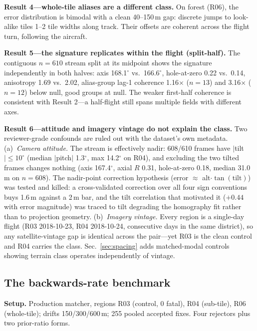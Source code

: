 \documentclass[journal]{IEEEtran}
\begin{document}
\textbf{Result 4---whole-tile aliases are a different class.} On forest (R06), the error distribution is bimodal with a clean 40--150\,m gap: discrete jumps to look-alike tiles 1--2 tile widths along track. Their offsets are coherent across the flight turn, following the aircraft.

\textbf{Result 5---the signature replicates within the flight (split-half).} The contiguous $n=610$ stream split at its midpoint shows the signature independently in both halves: axis 168.1$^{\circ}$ vs.\ 166.6$^{\circ}$, hole-at-zero 0.22 vs.\ 0.14, anisotropy 1.69 vs.\ 2.02, alias-group lag-1 coherence 1.16$\times$ ($n=13$) and 3.16$\times$ ($n=12$) below null, good groups at null. The weaker first-half coherence is consistent with Result 2---a half-flight still spans multiple fields with different axes.

\textbf{Result 6---attitude and imagery vintage do not explain the class.} Two reviewer-grade confounds are ruled out with the dataset's own metadata. (a)~\emph{Camera attitude.} The stream is effectively nadir: 608/610 frames have $|$tilt$| \leq 10^{\circ}$ (median $|$pitch$|$ 1.3$^{\circ}$, max 14.2$^{\circ}$ on R04), and excluding the two tilted frames changes nothing (axis 167.4$^{\circ}$, axial $R$ 0.31, hole-at-zero 0.18, median 31.0\,m on $n=608$). The nadir-point correction hypothesis (error $\approx$ alt$\cdot\tan(\mathrm{tilt})$) was tested and killed: a cross-validated correction over all four sign conventions buys 1.6\,m against a 2\,m bar, and the tilt correlation that motivated it ($+0.44$ with error magnitude) was traced to tilt degrading the homography fit rather than to projection geometry. (b)~\emph{Imagery vintage.} Every region is a single-day flight (R03 2018-10-23, R04 2018-10-24, consecutive days in the same district), so any satellite-vintage gap is identical across the pair---yet R03 is the clean control and R04 carries the class. Sec.~\ref{sec:spacing} adds matched-modal controls showing terrain class operates independently of vintage.

\subsection{The backwards-rate benchmark}
\label{sec:bench}

\textbf{Setup.} Production matcher, regions R03 (control, 0 fatal), R04 (sub-tile), R06 (whole-tile); drifts 150/300/600\,m; 255 pooled accepted fixes. Four rejectors plus two prior-ratio forms.
\end{document}

